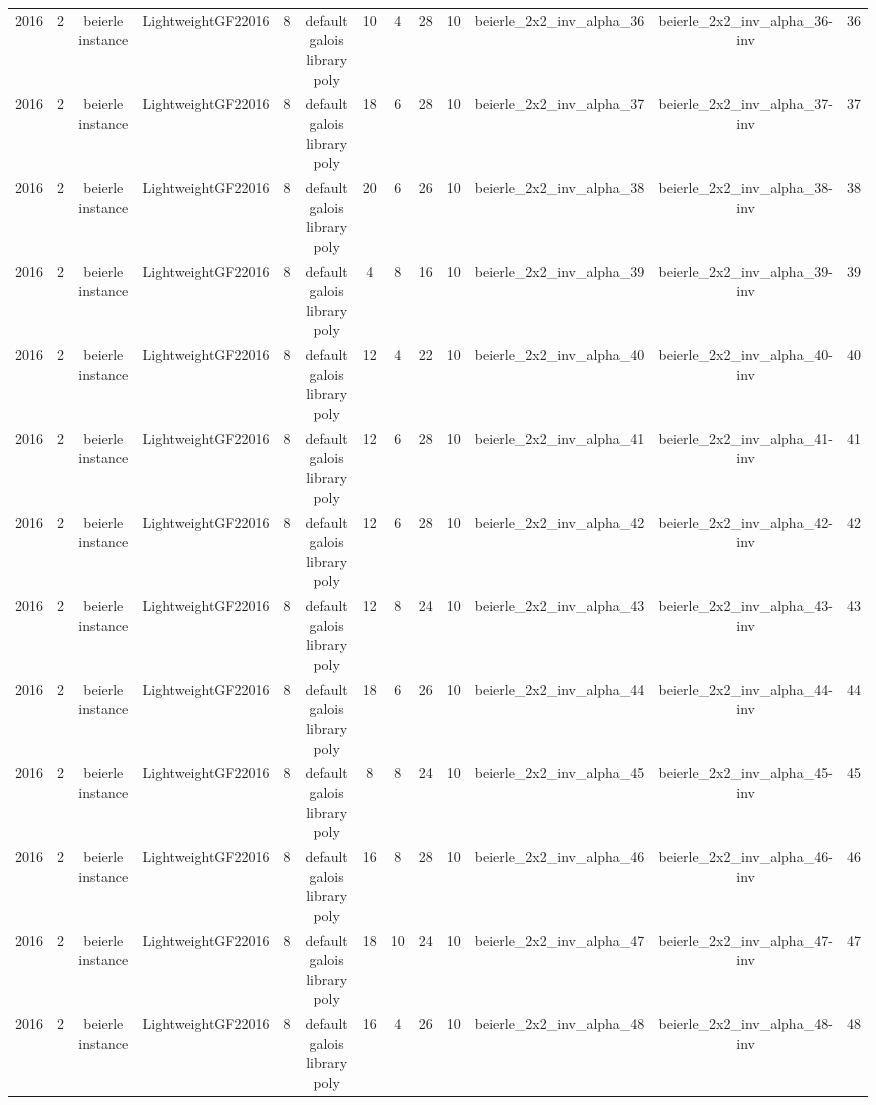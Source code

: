 \begin{tabular}{c c c c c c c c c c c c c}
2016 & 2 & beierle instance & LightweightGF22016 & 8 & default galois library poly & 10 & 4 & 28 & 10 & beierle_2x2_inv_alpha_36 & beierle_2x2_inv_alpha_36-inv & 36 \\
2016 & 2 & beierle instance & LightweightGF22016 & 8 & default galois library poly & 18 & 6 & 28 & 10 & beierle_2x2_inv_alpha_37 & beierle_2x2_inv_alpha_37-inv & 37 \\
2016 & 2 & beierle instance & LightweightGF22016 & 8 & default galois library poly & 20 & 6 & 26 & 10 & beierle_2x2_inv_alpha_38 & beierle_2x2_inv_alpha_38-inv & 38 \\
2016 & 2 & beierle instance & LightweightGF22016 & 8 & default galois library poly & 4 & 8 & 16 & 10 & beierle_2x2_inv_alpha_39 & beierle_2x2_inv_alpha_39-inv & 39 \\
2016 & 2 & beierle instance & LightweightGF22016 & 8 & default galois library poly & 12 & 4 & 22 & 10 & beierle_2x2_inv_alpha_40 & beierle_2x2_inv_alpha_40-inv & 40 \\
2016 & 2 & beierle instance & LightweightGF22016 & 8 & default galois library poly & 12 & 6 & 28 & 10 & beierle_2x2_inv_alpha_41 & beierle_2x2_inv_alpha_41-inv & 41 \\
2016 & 2 & beierle instance & LightweightGF22016 & 8 & default galois library poly & 12 & 6 & 28 & 10 & beierle_2x2_inv_alpha_42 & beierle_2x2_inv_alpha_42-inv & 42 \\
2016 & 2 & beierle instance & LightweightGF22016 & 8 & default galois library poly & 12 & 8 & 24 & 10 & beierle_2x2_inv_alpha_43 & beierle_2x2_inv_alpha_43-inv & 43 \\
2016 & 2 & beierle instance & LightweightGF22016 & 8 & default galois library poly & 18 & 6 & 26 & 10 & beierle_2x2_inv_alpha_44 & beierle_2x2_inv_alpha_44-inv & 44 \\
2016 & 2 & beierle instance & LightweightGF22016 & 8 & default galois library poly & 8 & 8 & 24 & 10 & beierle_2x2_inv_alpha_45 & beierle_2x2_inv_alpha_45-inv & 45 \\
2016 & 2 & beierle instance & LightweightGF22016 & 8 & default galois library poly & 16 & 8 & 28 & 10 & beierle_2x2_inv_alpha_46 & beierle_2x2_inv_alpha_46-inv & 46 \\
2016 & 2 & beierle instance & LightweightGF22016 & 8 & default galois library poly & 18 & 10 & 24 & 10 & beierle_2x2_inv_alpha_47 & beierle_2x2_inv_alpha_47-inv & 47 \\
2016 & 2 & beierle instance & LightweightGF22016 & 8 & default galois library poly & 16 & 4 & 26 & 10 & beierle_2x2_inv_alpha_48 & beierle_2x2_inv_alpha_48-inv & 48 \\

\end{tabular}
